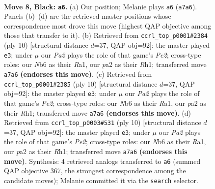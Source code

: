 \documentclass[11pt]{article}
\begin{document}
\begin{figure}[p]\centering
\begin{subfigure}{0.46\textwidth}\centering
\resizebox{\linewidth}{!}{%
\newchessgame
\chessboard[
  setfen={r1bqkb1r/pp2pppp/1nnp4/4P3/3P4/5NP1/PP2KP1P/RNBQ1B1R b kq - 0 8},
  showmover=false,
  pgfstyle=straightmove, color=movearrow, markmove={a7-a6}
]}
\caption{}
\end{subfigure}\hfill
\begin{subfigure}{0.46\textwidth}\centering
\resizebox{\linewidth}{!}{%
\newchessgame
\chessboard[
  setfen={rnbqkb1r/pp3ppp/4pn2/3p4/2PN4/2N5/PP2PPPP/R1BQKB1R w KQkq - 0 6},
  showmover=false,
  pgfstyle=straightmove, color=movearrow, markmove={e2-e3}
]}
\caption{}
\end{subfigure}
\\[4pt]
\begin{subfigure}{0.46\textwidth}\centering
\resizebox{\linewidth}{!}{%
\newchessgame
\chessboard[
  setfen={rnbqkb1r/pp3ppp/4pn2/3p4/2PN4/2N5/PP2PPPP/R1BQKB1R w KQkq - 0 6},
  showmover=false,
  pgfstyle=straightmove, color=movearrow, markmove={e2-e3}
]}
\caption{}
\end{subfigure}\hfill
\begin{subfigure}{0.46\textwidth}\centering
\resizebox{\linewidth}{!}{%
\newchessgame
\chessboard[
  setfen={rnbqkb1r/pp3ppp/4pn2/3p4/2PN4/2N5/PP2PPPP/R1BQKB1R w KQkq - 0 6},
  showmover=false,
  pgfstyle=straightmove, color=movearrow, markmove={e2-e3}
]}
\caption{}
\end{subfigure}
\caption{\textbf{Move 8, Black: \texttt{a6}.} (a) Our position; Melanie plays \texttt{a6} (\texttt{a7a6}). Panels (b)--(d) are the retrieved master positions whose correspondence most drove this move (highest QAP objective among those that transfer to it). (b) Retrieved from \texttt{ccrl\_top\_p0001\#2384} (ply 10) [structural distance $d$=37, QAP obj=92]: the master played \texttt{e3}; under $\mu$ our \emph{Pa2} plays the role of that game's \emph{Pe2}; cross-type roles: our \emph{N}b6 as their \emph{R}a1, our \emph{p}a2 as their \emph{R}h1; transferred move \texttt{a7a6} \textbf{(endorses this move)}. (c) Retrieved from \texttt{ccrl\_top\_p0001\#2385} (ply 10) [structural distance $d$=37, QAP obj=92]: the master played \texttt{e3}; under $\mu$ our \emph{Pa2} plays the role of that game's \emph{Pe2}; cross-type roles: our \emph{N}b6 as their \emph{R}a1, our \emph{p}a2 as their \emph{R}h1; transferred move \texttt{a7a6} \textbf{(endorses this move)}. (d) Retrieved from \texttt{ccrl\_top\_p0003\#531} (ply 10) [structural distance $d$=37, QAP obj=92]: the master played \texttt{e3}; under $\mu$ our \emph{Pa2} plays the role of that game's \emph{Pe2}; cross-type roles: our \emph{N}b6 as their \emph{R}a1, our \emph{p}a2 as their \emph{R}h1; transferred move \texttt{a7a6} \textbf{(endorses this move)}. Synthesis: 4 retrieved analogs transferred to \texttt{a6} (summed QAP objective 367, the strongest correspondence among the candidate moves); Melanie committed it via the \texttt{search} selector.}
\label{fig:thought-m15}
\end{figure}
\end{document}
